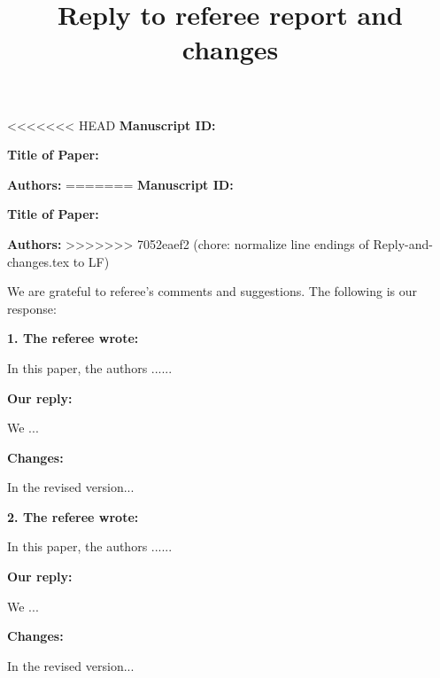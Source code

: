 \documentclass[11pt]{article}
\begin{document}
\title{Reply to referee report and changes}

\date{}
\author{}
\maketitle

<<<<<<< HEAD
\noindent\textbf{Manuscript ID:}


\noindent\textbf{Title of Paper:}

\noindent\textbf{Authors:}
=======
\noindent\textbf{Manuscript ID:} 


\noindent\textbf{Title of Paper:} 

\noindent\textbf{Authors:} 
>>>>>>> 7052eaef2 (chore: normalize line endings of Reply-and-changes.tex to LF)

We are grateful to referee's comments and suggestions. The following is our response:


\textbf{1. The referee wrote:}

In this paper, the authors ......

\textbf{Our reply:}

We ...

\textbf{Changes:}

In the revised version...

\textbf{2. The referee wrote:}

In this paper, the authors ......

\textbf{Our reply:}

We ...

\textbf{Changes:}

In the revised version...
\end{document}

